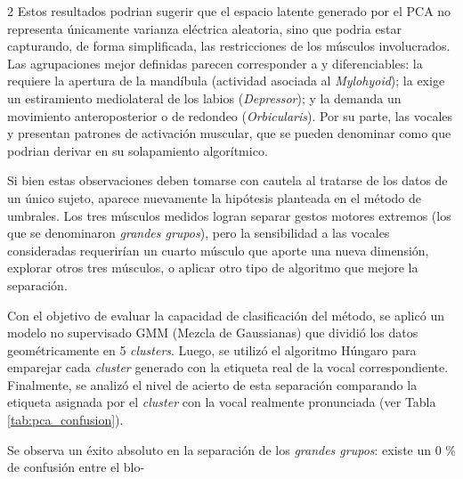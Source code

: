 \documentclass[11pt, letterpaper]{article}
\begin{document}
\begin{multicols*}{2}
Estos resultados podrian sugerir que el espacio latente generado por el PCA no representa únicamente varianza eléctrica aleatoria, sino que podria estar capturando, de forma simplificada, las restricciones  de los músculos involucrados. Las agrupaciones mejor definidas parecen corresponder a  y diferenciables: la  requiere la apertura de la mandíbula (actividad asociada al \textit{Mylohyoid}); la  exige un estiramiento mediolateral de los labios (\textit{Depressor}); y la  demanda un movimiento anteroposterior o de redondeo (\textit{Orbicularis}). Por su parte, las vocales  y  presentan patrones de activación muscular, que se pueden denominar como  que podrian derivar en su solapamiento algorítmico.

Si bien estas observaciones deben tomarse con cautela al tratarse de los datos de un único sujeto, aparece nuevamente la hipótesis planteada en el método de umbrales. Los tres músculos medidos logran separar gestos motores extremos (los que se denominaron \textit{grandes grupos}), pero la sensibilidad a las vocales consideradas  requerirían un cuarto músculo que aporte una nueva dimensión, explorar otros tres músculos, o aplicar otro tipo de algoritmo que mejore la separación.

Con el objetivo de evaluar la capacidad de clasificación del método, se aplicó un modelo no supervisado GMM (Mezcla de Gaussianas) que dividió los datos geométricamente en 5 \textit{clusters}. Luego, se utilizó el algoritmo Húngaro para emparejar cada \textit{cluster} generado con la etiqueta real de la vocal correspondiente. Finalmente, se analizó el nivel de acierto de esta separación comparando la etiqueta asignada por el \textit{cluster} con la vocal realmente pronunciada (ver Tabla \ref{tab:pca_confusion}).

Se observa un éxito absoluto en la separación de los \textit{grandes grupos}: existe un 0 \% de confusión entre el blo-


\end{multicols*}
\end{document}
